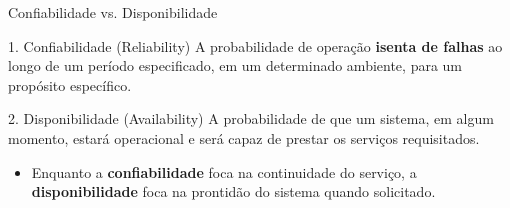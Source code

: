 \documentclass[9pt]{beamer}
\begin{document}
\begin{frame}{Confiabilidade vs. Disponibilidade}
    \begin{block}{1. Confiabilidade (Reliability)}
        A probabilidade de operação \textbf{isenta de falhas} ao longo de um período especificado, em um determinado ambiente, para um propósito específico.
    \end{block}

    \begin{block}{2. Disponibilidade (Availability)}
        A probabilidade de que um sistema, em algum momento, estará operacional e será capaz de prestar os serviços requisitados.
    \end{block}
    
    \vspace{0.3cm}
    \begin{itemize}
        \item Enquanto a \textbf{confiabilidade} foca na continuidade do serviço, a \textbf{disponibilidade} foca na prontidão do sistema quando solicitado.
    \end{itemize}
\end{frame}
\end{document}
